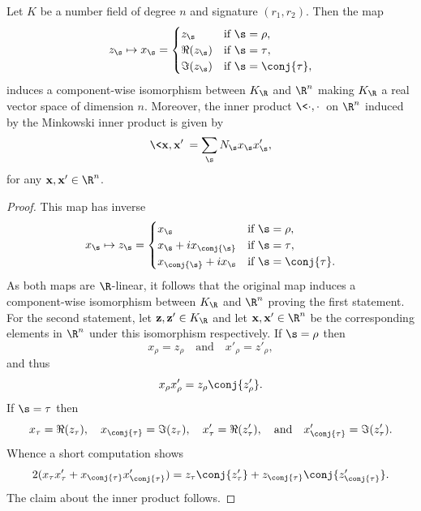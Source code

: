 \documentclass[12pt]{article}
\begin{document}
      \begin{proposition}\label{prop:Minkowski_space_isomorphism}
        Let \(K\) be a number field of degree \(n\) and signature \((r_{1},r_{2})\). Then the map
        \[
          z_{\s} \mapsto x_{\s} = \begin{cases} z_{\s} & \text{if \(\s = \rho\)}, \\ \Re(z_{\s}) & \text{if \(\s = \tau\)}, \\ \Im(z_{\s}) & \text{if \(\s = \conj{\tau}\)}, \end{cases}
        \]
        induces a component-wise isomorphism between \(K_{\R}\) and \(\R^{n}\) making \(K_{\R}\) a real vector space of dimension \(n\). Moreover, the inner product \(\<\cdot,\cdot\>\) on \(\R^{n}\) induced by the Minkowski inner product is given by
        \[
          \<\mathbf{x},\mathbf{x}'\> = \sum_{\s}N_{\s}x_{\s}x'_{\s},
        \]
        for any \(\mathbf{x},\mathbf{x}' \in \R^{n}\).
      \end{proposition}
      \begin{proof}
        This map has inverse
        \[
          x_{\s} \mapsto z_{\s} = \begin{cases} x_{\s} & \text{if \(\s = \rho\)}, \\ x_{\s}+ix_{\conj{\s}} & \text{if \(\s = \tau\)}, \\ x_{\conj{\s}}+ix_{\s} & \text{if \(\s = \conj{\tau}\)}. \end{cases}
        \]
        As both maps are \(\R\)-linear, it follows that the original map induces a component-wise isomorphism between \(K_{\R}\) and \(\R^{n}\) proving the first statement. For the second statement, let \(\mathbf{z},\mathbf{z}' \in K_{\R}\) and let \(\mathbf{x},\mathbf{x}' \in \R^{n}\) be the corresponding elements in \(\R^{n}\) under this isomorphism respectively. If \(\s = \rho\) then
        \[
          x_{\rho} = z_{\rho} \quad \text{and} \quad x'_{\rho} = z'_{\rho},
        \]
        and thus
        \[
          x_{\rho}x'_{\rho} = z_{\rho}\conj{z'_{\rho}}.
        \]
        If \(\s = \tau\) then
        \[
          x_{\tau} = \Re(z_{\tau}), \quad x_{\conj{\tau}} = \Im(z_{\tau}), \quad x'_{\tau} = \Re(z'_{\tau}), \quad \text{and} \quad x'_{\conj{\tau}} = \Im(z'_{\tau}).
        \]
        Whence a short computation shows
        \[
          2(x_{\tau}x'_{\tau}+x_{\conj{\tau}}x'_{\conj{\tau}}) = z_{\tau}\conj{z'_{\tau}}+z_{\conj{\tau}}\conj{z'_{\conj{\tau}}}.
        \]
        The claim about the inner product follows.
      \end{proof}
\end{document}
